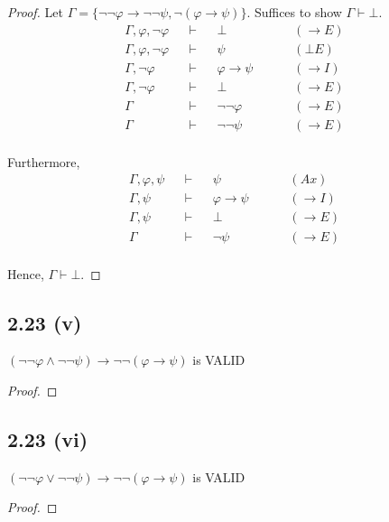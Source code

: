 \documentclass[12pt]{article}
\begin{document}
\begin{proof}
Let $\Gamma = \{\neg \neg \varphi \rightarrow \neg \neg \psi, \neg(\varphi \rightarrow \psi)\}$. Suffices to show $\Gamma \vdash \bot$.
\begin{align*}
    \Gamma, \varphi, \neg \varphi &&\vdash&& \bot &&&& (\rightarrow E) \\
    \Gamma, \varphi, \neg \varphi &&\vdash&& \psi &&&& (\bot E) \\
    \Gamma, \neg \varphi &&\vdash&& \varphi \rightarrow \psi &&&& (\rightarrow I) \\
    \Gamma, \neg \varphi &&\vdash&& \bot &&&& (\rightarrow E) \\
    \Gamma &&\vdash&& \neg \neg \varphi &&&& (\rightarrow E) \\
    \Gamma &&\vdash&& \neg \neg \psi &&&& (\rightarrow E) \\
\end{align*}

Furthermore,
\begin{align*}
    \Gamma, \varphi, \psi &&\vdash&& \psi &&&& (Ax) \\
    \Gamma, \psi &&\vdash&& \varphi \rightarrow \psi &&&& (\rightarrow I) \\
    \Gamma, \psi &&\vdash&& \bot &&&& (\rightarrow E) \\
    \Gamma &&\vdash&& \neg \psi &&&& (\rightarrow E) \\
\end{align*}

Hence, $\Gamma \vdash \bot$.
\end{proof}

\subsection*{2.23 (v)} 
$(\neg \neg \varphi \wedge \neg \neg \psi) \rightarrow \neg \neg (\varphi \rightarrow \psi)$ is VALID

\begin{proof}

\end{proof}

\subsection*{2.23 (vi)} 
$(\neg \neg \varphi \vee \neg \neg \psi) \rightarrow \neg \neg (\varphi \rightarrow \psi)$ is VALID

\begin{proof}

\end{proof}
\end{document}
